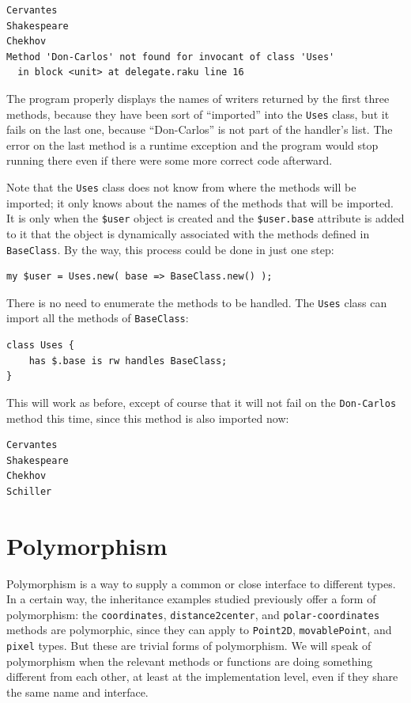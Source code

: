 \begin{verbatim}
Cervantes
Shakespeare
Chekhov
Method 'Don-Carlos' not found for invocant of class 'Uses'
  in block <unit> at delegate.raku line 16
\end{verbatim}

The program properly displays the names of writers returned 
by the first three methods, because they have been sort of 
``imported'' into the {\tt Uses} class, but it fails on the 
last one, because ``Don-Carlos'' is not part of the handler's 
list. The error on the last method is a runtime exception 
and the program would stop running there even if there 
were some more correct code afterward. 

Note that the {\tt Uses} class does not know from where the 
methods will be imported; it only knows about the names of 
the methods that will be imported. It is only when the 
\verb'$user' object is created and the \verb'$user.base' 
attribute is added to it that the object is dynamically 
associated with the methods defined in {\tt BaseClass}. 
By the way, this process could be done in just one step:

\begin{verbatim}
my $user = Uses.new( base => BaseClass.new() );
\end{verbatim}

There is no need to enumerate the methods to be handled. The 
{\tt Uses} class can import all the methods of {\tt BaseClass}:

\begin{verbatim}
class Uses { 
    has $.base is rw handles BaseClass;
}
\end{verbatim}

This will work as before, except of course that it will not fail 
on the {\tt Don-Carlos} method this time, since this method is 
also imported now:

\begin{verbatim}
Cervantes
Shakespeare
Chekhov
Schiller
\end{verbatim} 

\section{Polymorphism}

Polymorphism is a way to supply a common or close interface 
to different types. In a certain way, the inheritance examples 
studied previously offer a form of polymorphism: the 
{\tt coordinates}, {\tt distance2center}, and {\tt polar-coordinates} 
methods are polymorphic, since they can apply to 
{\tt Point2D}, {\tt movablePoint}, and {\tt pixel} types. But 
these are trivial forms of polymorphism. We will speak of 
polymorphism when the relevant methods or functions are 
doing something different from each other, at least at the 
implementation level, even if they share the same name and 
interface.

